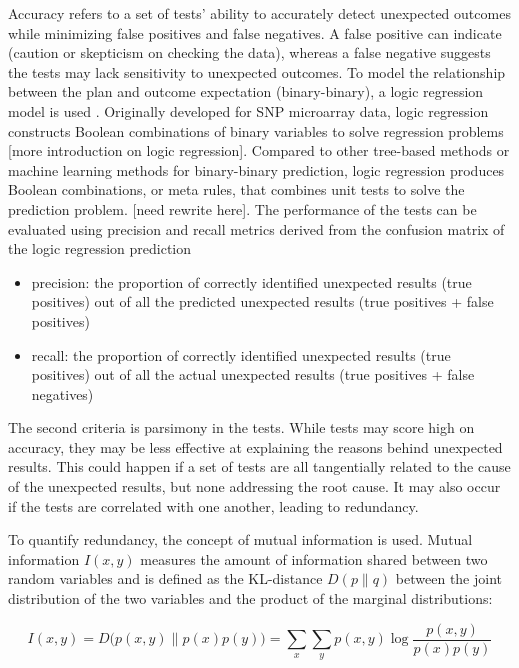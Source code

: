 \documentclass[
]{jds}
\providecommand{\tightlist}{%
  \setlength{\itemsep}{0pt}\setlength{\parskip}{0pt}}\usepackage{longtable,booktabs,array}
\begin{document}
Accuracy refers to a set of tests' ability to accurately detect
unexpected outcomes while minimizing false positives and false
negatives. A false positive can indicate (caution or skepticism on
checking the data), whereas a false negative suggests the tests may lack
sensitivity to unexpected outcomes. To model the relationship between
the plan and outcome expectation (binary-binary), a logic regression
model is used \citep{ruczinski_logic_2003}. Originally developed for SNP
microarray data, logic regression constructs Boolean combinations of
binary variables to solve regression problems {[}more introduction on
logic regression{]}. Compared to other tree-based methods or machine
learning methods for binary-binary prediction, logic regression produces
Boolean combinations, or meta rules, that combines unit tests to solve
the prediction problem. {[}need rewrite here{]}. The performance of the
tests can be evaluated using precision and recall metrics derived from
the confusion matrix of the logic regression prediction

\begin{itemize}
\tightlist
\item
  precision: the proportion of correctly identified unexpected results
  (true positives) out of all the predicted unexpected results (true
  positives + false positives)
\item
  recall: the proportion of correctly identified unexpected results
  (true positives) out of all the actual unexpected results (true
  positives + false negatives)
\end{itemize}

The second criteria is parsimony in the tests. While tests may score
high on accuracy, they may be less effective at explaining the reasons
behind unexpected results. This could happen if a set of tests are all
tangentially related to the cause of the unexpected results, but none
addressing the root cause. It may also occur if the tests are correlated
with one another, leading to redundancy.

To quantify redundancy, the concept of mutual information is used.
Mutual information \(I(x, y)\) measures the amount of information shared
between two random variables and is defined as the KL-distance
\(D(p \parallel q)\) between the joint distribution of the two variables
and the product of the marginal distributions:

\[I(x,y) = D\big(p(x,y) \parallel p(x)p(y)\big) = \sum_x \sum_y p(x,y) \log \frac{p(x,y)}{p(x)p(y)}\]
\end{document}

